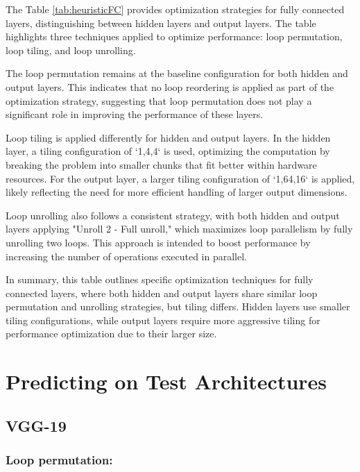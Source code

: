 The Table \ref{tab:heuristicFC} provides optimization strategies for fully connected layers, distinguishing between hidden layers and output layers. The table highlights three techniques applied to optimize performance: loop permutation, loop tiling, and loop unrolling.

The loop permutation remains at the baseline configuration for both hidden and output layers. This indicates that no loop reordering is applied as part of the optimization strategy, suggesting that loop permutation does not play a significant role in improving the performance of these layers.

Loop tiling is applied differently for hidden and output layers. In the hidden layer, a tiling configuration of `1,4,4` is used, optimizing the computation by breaking the problem into smaller chunks that fit better within hardware resources. For the output layer, a larger tiling configuration of `1,64,16` is applied, likely reflecting the need for more efficient handling of larger output dimensions.

Loop unrolling also follows a consistent strategy, with both hidden and output layers applying "Unroll 2 - Full unroll," which maximizes loop parallelism by fully unrolling two loops. This approach is intended to boost performance by increasing the number of operations executed in parallel.

In summary, this table outlines specific optimization techniques for fully connected layers, where both hidden and output layers share similar loop permutation and unrolling strategies, but tiling differs. Hidden layers use smaller tiling configurations, while output layers require more aggressive tiling for performance optimization due to their larger size.


\clearpage
\section{Predicting on Test Architectures}
\subsection{VGG-19}

\subsubsection{Loop permutation:}

